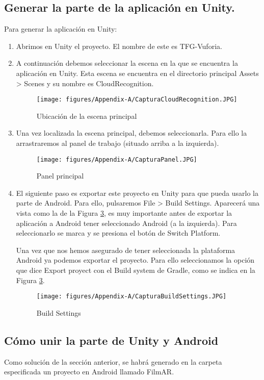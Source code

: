 \subsection{Generar la parte de la aplicación en Unity.}
Para generar la aplicación en Unity:
\begin{enumerate}
    \item Abrimos en Unity el proyecto. El nombre de este es TFG-Vuforia.
    \item A continuación debemos seleccionar la escena en la que se encuentra la aplicación en Unity. Esta escena se encuentra en 
    el directorio principal Assets > Scenes y su nombre es CloudRecognition.
    \begin{figure}[H]
        \centering
        \texttt{[image: figures/Appendix-A/CapturaCloudRecognition.JPG]}
        \caption{Ubicación de la escena principal}
        \label{fig:CloudRecognitionUbication}
    \end{figure}
    \item Una vez localizada la escena principal, debemos seleccionarla. Para ello la arrastraremos al panel de trabajo (situado 
    arriba a la izquierda).
    \begin{figure}[H]
        \centering
        \texttt{[image: figures/Appendix-A/CapturaPanel.JPG]}
        \caption{Panel principal}
        \label{fig:CloudRecognitionUbication}
    \end{figure}
    \item El siguiente paso es exportar este proyecto en Unity para que pueda usarlo la parte de Android. Para ello, pulsaremos 
    File > Build Settings. Aparecerá una vista como la de la Figura \ref{fig:BuildSettings}, es muy importante antes de exportar la 
    aplicación a Android tener seleccionado Android (a la izquierda). Para seleccionarlo se marca y se presiona el botón de Switch Platform.

    Una vez que nos hemos asegurado de tener seleccionada la plataforma Android ya podemos exportar el proyecto. Para ello seleccionamos la opción 
    que dice Export proyect con el Build system de Gradle, como se indica en la Figura \ref{fig:BuildSettings}.
    \begin{figure}[H]
        \centering
        \texttt{[image: figures/Appendix-A/CapturaBuildSettings.JPG]}
        \caption{Build Settings}
        \label{fig:BuildSettings}
    \end{figure}
\end{enumerate}
\subsection{Cómo unir la parte de Unity y Android}
Como solución de la sección anterior, se habrá generado en la carpeta especificada un proyecto en Android llamado FilmAR.

